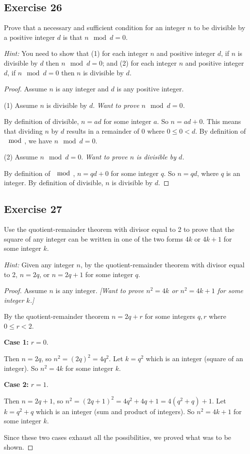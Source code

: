 \documentclass[14pt]{extarticle}
\begin{document}
\subsection{Exercise 26}
Prove that a necessary and sufficient condition for an integer $n$ to be divisible by a positive integer $d$ is that $n \mod d = 0$.

{\it Hint:} You need to show that (1) for each integer $n$ and positive integer $d$, if $n$ is divisible by $d$ then $n \mod d = 0$; and (2) for each integer $n$ and positive integer $d$, if $n \mod d = 0$ then $n$ is divisible by $d$.

\begin{proof}
Assume $n$ is any integer and $d$ is any positive integer.

(1) Assume $n$ is divisible by $d$. {\it Want to prove $n \mod d = 0$.}

By definition of divisible, $n = ad$ for some integer $a$. So $n = ad + 0$. This means that dividing $n$ by $d$ results in a remainder of $0$ where $0 \leq 0 < d$. By definition of $\mod$, we have $n \mod d = 0$.

(2) Assume $n \mod d = 0$. {\it Want to prove $n$ is divisible by $d$.}

By definition of $\mod$, $n = qd + 0$ for some integer $q$. So $n = qd$, where $q$ is an integer. By definition of divisible, $n$ is divisible by $d$.
\end{proof}

\subsection{Exercise 27}
Use the quotient-remainder theorem with divisor equal to 2 to prove that the square of any integer can be written in one of the two forms $4k$ or $4k + 1$ for some integer $k$.

{\it Hint:} Given any integer $n$, by the quotient-remainder theorem with divisor equal to 2, $n = 2q$, or $n = 2q + 1$ for some integer $q$.

\begin{proof}
Assume $n$ is any integer. {\it [Want to prove $n^2 = 4k$ or $n^2 = 4k+1$ for some integer $k$.]}

By the quotient-remainder theorem $n = 2q+r$ for some integers $q, r$ where $0 \leq r < 2$.

{\bf Case 1:} $r = 0$.

Then $n = 2q$, so $n^2 = (2q)^2 = 4q^2$. Let $k = q^2$ which is an integer (square of an integer). So $n^2 = 4k$ for some integer $k$.

{\bf Case 2:} $r = 1$.

Then $n = 2q+1$, so $n^2 = (2q+1)^2 = 4q^2+4q+1 = 4(q^2+q)+1$. Let $k = q^2+q$ which is an integer (sum and product of integers). So $n^2 = 4k+1$ for some integer $k$.

Since these two cases exhaust all the possibilities, we proved what was to be shown.
\end{proof}
\end{document}
